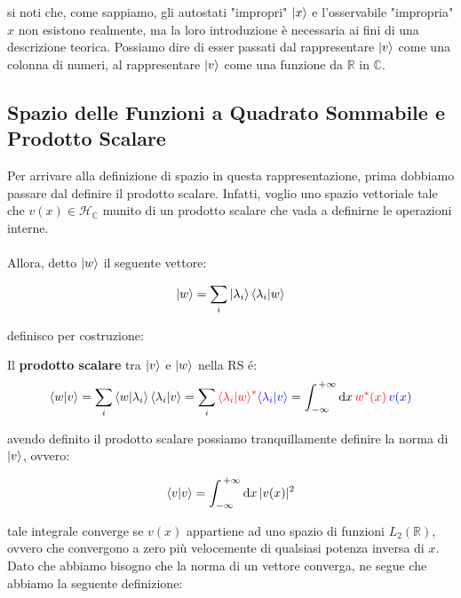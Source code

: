	si noti che, come sappiamo, gli autostati "impropri" $\ket{x}$ e l'osservabile "impropria" $x$ non esistono realmente, ma la loro introduzione è necessaria ai fini di una descrizione teorica. Possiamo dire di esser passati dal rappresentare $\ket{v}$ come una colonna di numeri, al rappresentare $\ket{v}$ come una funzione da $\mathbb{R}$ in $\mathbb{C}$.

\subsection{Spazio delle Funzioni a Quadrato Sommabile e Prodotto Scalare}
	
	Per arrivare alla definizione di spazio in questa rappresentazione, prima dobbiamo passare dal definire il prodotto scalare. Infatti, voglio uno spazio vettoriale tale che $v(x) \in \mathcal{H}_{\mathbb{C}}$ munito di un prodotto scalare che vada a definirne le operazioni interne. 
	\\
	\\
	Allora, detto $\ket{w}$ il seguente vettore:
	
\begin{align*}
	\ket{w} = \sum_i \ket{\lambda_i} \braket{\lambda_i}{w}
\end{align*}

	definisco per costruzione:
	
\begin{mydef}
	Il \textbf{prodotto scalare} tra $\ket{v}$ e $\ket{w}$ nella RS é:
\begin{align*}
	\braket{w}{v} = \sum_i \braket{w}{\lambda_i} \braket{\lambda_i}{v} = \sum_i \textcolor{red}{\braket{\lambda_i}{w}^*} \textcolor{blue}{\braket{\lambda_i}{v} }= \int_{-\infty}^{\, +\infty} \dd x \, \textcolor{red}{w^*(x)} \, \textcolor{blue}{v(x)}
\end{align*}
\end{mydef}

	avendo definito il prodotto scalare possiamo tranquillamente definire la norma di $\ket{v}$, ovvero:
	
\begin{align*}
	\braket{v} = \int_{-\infty}^{\, +\infty} \dd x \, |v(x)|^2
\end{align*}

	tale integrale converge se $v(x)$ appartiene ad uno spazio di funzioni $L_2(\mathbb{R})$, ovvero che convergono a zero più velocemente di qualsiasi potenza inversa di $x$. Dato che abbiamo bisogno che la norma di un vettore converga, ne segue che abbiamo la seguente definizione:
	
